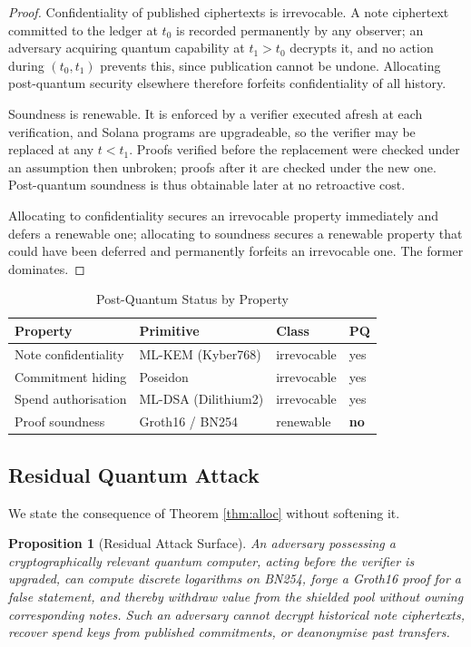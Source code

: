 \documentclass[11pt,a4paper]{article}
\newtheorem{proposition}[theorem]{Proposition}
\begin{document}
\begin{proof}
Confidentiality of published ciphertexts is irrevocable. A note ciphertext committed to the ledger at $t_0$ is recorded permanently by any observer; an adversary acquiring quantum capability at $t_1 > t_0$ decrypts it, and no action during $(t_0, t_1)$ prevents this, since publication cannot be undone. Allocating post-quantum security elsewhere therefore forfeits confidentiality of all history.

Soundness is renewable. It is enforced by a verifier executed afresh at each verification, and Solana programs are upgradeable, so the verifier may be replaced at any $t < t_1$. Proofs verified before the replacement were checked under an assumption then unbroken; proofs after it are checked under the new one. Post-quantum soundness is thus obtainable later at no retroactive cost.

Allocating to confidentiality secures an irrevocable property immediately and defers a renewable one; allocating to soundness secures a renewable property that could have been deferred and permanently forfeits an irrevocable one. The former dominates.
\end{proof}

\begin{table}[h]
\centering
\caption{Post-Quantum Status by Property}
\begin{tabular}{@{}llll@{}}
\toprule
\textbf{Property} & \textbf{Primitive} & \textbf{Class} & \textbf{PQ} \\ \midrule
Note confidentiality & ML-KEM (Kyber768) & irrevocable & yes \\
Commitment hiding & Poseidon & irrevocable & yes \\
Spend authorisation & ML-DSA (Dilithium2) & irrevocable & yes \\
Proof soundness & Groth16 / BN254 & renewable & \textbf{no} \\ \bottomrule
\end{tabular}
\end{table}

\subsection{Residual Quantum Attack}
\label{sec:residual}

We state the consequence of Theorem \ref{thm:alloc} without softening it.

\begin{proposition}[Residual Attack Surface]
An adversary possessing a cryptographically relevant quantum computer, acting before the verifier is upgraded, can compute discrete logarithms on BN254, forge a Groth16 proof for a false statement, and thereby withdraw value from the shielded pool without owning corresponding notes. Such an adversary cannot decrypt historical note ciphertexts, recover spend keys from published commitments, or deanonymise past transfers.
\end{proposition}
\end{document}
